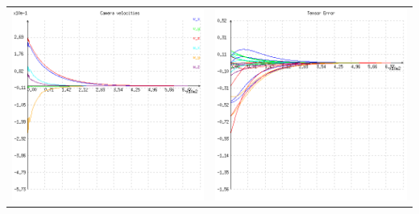 {\begin{center}
\begin{tabular}{cc}
  \includegraphics[height=0.15\textheight]{figures/plots/ex5cvelocity.png}&
  \includegraphics[height=0.15\textheight]{figures/plots/ex5cerror.png}\\

\end{tabular}
\end{center}}
